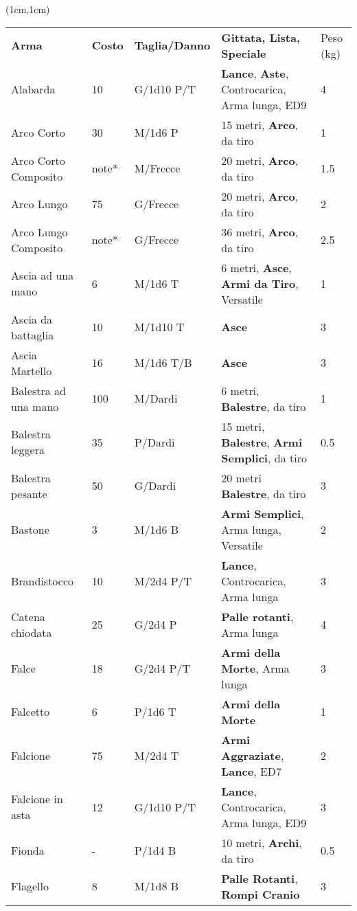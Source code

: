 \documentclass[a4paper,12 pt,openany]{book}
\begin{document}
	\begin{textblock*}{19.5cm}(1cm,1cm) %
		\footnotesize
		\begin{tabular}{lllll}
\textbf{Arma}&\textbf{Costo}&\textbf{Taglia/Danno} & \textbf{Gittata, Lista, Speciale} & Peso (kg)\\

Alabarda& 10 & G/1d10 P/T& \textbf{Lance}, \textbf{Aste}, Controcarica, Arma lunga, ED9 & 4\\
Arco Corto& 30 & M/1d6 P& 15 metri, \textbf{Arco}, da tiro& 1\\
Arco Corto Composito& note*& M/Frecce& 20 metri, \textbf{Arco}, da tiro& 1.5\\
Arco Lungo& 75 & G/Frecce& 20 metri, \textbf{Arco}, da tiro& 2\\
Arco Lungo Composito& note*& G/Frecce& 36 metri, \textbf{Arco}, da tiro& 2.5\\
Ascia ad una mano& 6  & M/1d6 T& 6 metri, \textbf{Asce}, \textbf{Armi da Tiro}, Versatile& 1\\
Ascia da battaglia& 10 & M/1d10 T&\textbf{Asce}& 3\\
Ascia Martello& 16 & M/1d6 T/B& \textbf{Asce}& 3\\
Balestra ad una mano& 100& M/Dardi& 6 metri, \textbf{Balestre}, da tiro& 1\\
Balestra leggera& 35 & P/Dardi& 15 metri, \textbf{Balestre}, \textbf{Armi Semplici}, da tiro& 0.5\\
Balestra pesante& 50 & G/Dardi& 20 metri \textbf{Balestre}, da tiro& 3\\
Bastone& 3& M/1d6 B& \textbf{Armi Semplici}, Arma lunga, Versatile& 2\\
Brandistocco& 10 & M/2d4 P/T& \textbf{Lance}, Controcarica, Arma lunga& 3\\
Catena chiodata& 25 & G/2d4 P& \textbf{Palle rotanti}, Arma lunga& 4\\
Falce& 18 & G/2d4 P/T& \textbf{Armi della Morte}, Arma lunga& 3\\
Falcetto& 6& P/1d6 T& \textbf{Armi della Morte} & 1\\
Falcione& 75 & M/2d4 T& \textbf{Armi Aggraziate}, \textbf{Lance}, ED7& 2\\
Falcione in asta& 12 & G/1d10 P/T& \textbf{Lance}, Controcarica, Arma lunga, ED9& 3\\
Fionda& -& P/1d4 B& 10 metri, \textbf{Archi}, da tiro& 0.5\\
Flagello& 8& M/1d8 B& \textbf{Palle Rotanti}, \textbf{Rompi Cranio}& 3\\

\end{tabular}
\end{textblock*}
\end{document}

